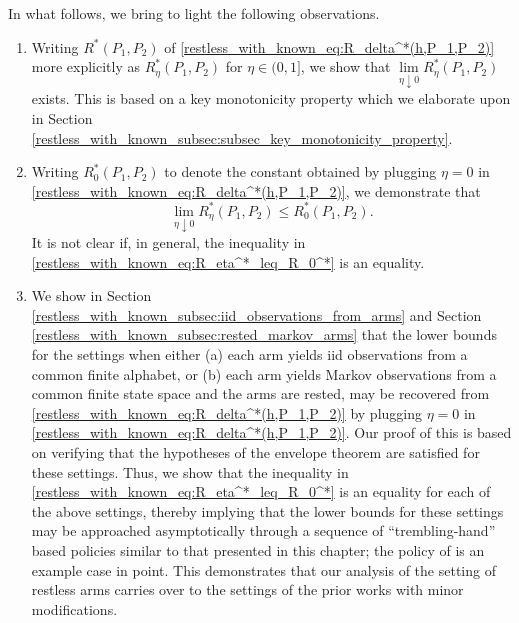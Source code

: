 
In what follows, we bring to light the following observations.
\begin{enumerate}
	\item Writing $R^*(P_1,P_2)$ of \eqref{restless_with_known_eq:R_delta^*(h,P_1,P_2)} more explicitly as $R_\eta^*(P_1,P_2)$ for $\eta\in (0,1]$, we show that $\lim\limits_{\eta\downarrow 0}R_\eta^*(P_1,P_2)$ exists. This is based on a key monotonicity property which we elaborate upon in  Section \ref{restless_with_known_subsec:subsec_key_monotonicity_property}.
	\item Writing $R_0^*(P_1,P_2)$ to denote the constant obtained by plugging $\eta=0$ in \eqref{restless_with_known_eq:R_delta^*(h,P_1,P_2)}, we demonstrate that
		\begin{equation}
			\lim\limits_{\eta\downarrow 0}R_\eta^*(P_1,P_2)\leq R_0^*(P_1,P_2).\label{restless_with_known_eq:R_eta^*_leq_R_0^*}
		\end{equation}
	 It is not clear if, in general, the inequality in \eqref{restless_with_known_eq:R_eta^*_leq_R_0^*} is an equality.
	 \item We show in Section \ref{restless_with_known_subsec:iid_observations_from_arms} and Section \ref{restless_with_known_subsec:rested_markov_arms} that the lower bounds for the settings when either (a) each arm yields iid observations from a common finite alphabet, or (b) each arm yields Markov observations from a common finite state space and the arms are rested, may be recovered from \eqref{restless_with_known_eq:R_delta^*(h,P_1,P_2)} by plugging $\eta=0$ in \eqref{restless_with_known_eq:R_delta^*(h,P_1,P_2)}. Our proof of this is based on verifying that the hypotheses of the envelope theorem \cite[Theorem 2]{milgrom2002envelope} are satisfied for these settings. Thus, we show that the inequality in \eqref{restless_with_known_eq:R_eta^*_leq_R_0^*} is an equality for each of the above settings, thereby implying that the lower bounds for these settings may be approached asymptotically through a sequence of ``trembling-hand'' based policies similar to that presented in this chapter; the policy of \cite[Section II.B]{Vaidhiyan2017} is an example case in point. {\color{black} This demonstrates that our analysis of the setting of restless arms carries over to the settings of the prior works with minor modifications.}      
\end{enumerate} 

